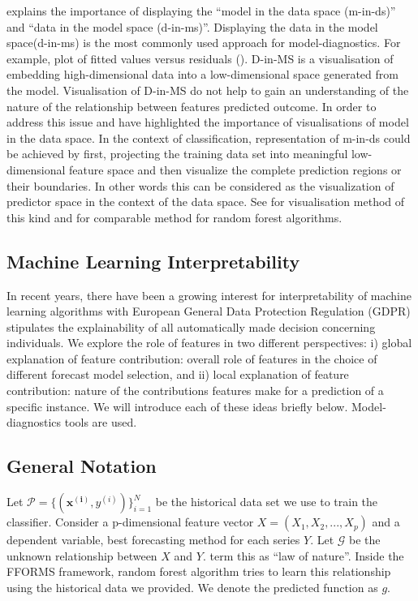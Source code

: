 \documentclass[11pt,a4paper,]{article}
\theoremstyle{definition}
\theoremstyle{definition}
\theoremstyle{definition}
\theoremstyle{remark}
\begin{document}
\textcite{wickham2015visualizing} explains the importance of displaying
the ``model in the data space (m-in-ds)'' and ``data in the model space
(d-in-ms)''. Displaying the data in the model space(d-in-ms) is the most
commonly used approach for model-diagnostics. For example, plot of
fitted values versus residuals (\textcite{wickham2015visualizing}).
D-in-MS is a visualisation of embedding high-dimensional data into a
low-dimensional space generated from the model. Visualisation of D-in-MS
do not help to gain an understanding of the nature of the relationship
between features predicted outcome. In order to address this issue
\textcite{wickham2015visualizing} and \textcite{da2017interactive} have
highlighted the importance of visualisations of model in the data space.
In the context of classification, representation of m-in-ds could be
achieved by first, projecting the training data set into meaningful
low-dimensional feature space and then visualize the complete prediction
regions or their boundaries. In other words this can be considered as
the visualization of predictor space in the context of the data space.
See \textcite{wickham2015visualizing} for visualisation method of this
kind and \textcite{da2017interactive} for comparable method for random
forest algorithms.

\subsection{Machine Learning
Interpretability}\label{machine-learning-interpretability}

In recent years, there have been a growing interest for interpretability
of machine learning algorithms with European General Data Protection
Regulation (GDPR) stipulates the explainability of all automatically
made decision concerning individuals. We explore the role of features in
two different perspectives: i) global explanation of feature
contribution: overall role of features in the choice of different
forecast model selection, and ii) local explanation of feature
contribution: nature of the contributions features make for a prediction
of a specific instance. We will introduce each of these ideas briefly
below. Model-diagnostics tools are used.

\subsection{General Notation}\label{general-notation}

Let \(\mathcal{P}=\{(\mathbf{x^{(i)}}, y^{(i)})\}_{i=1}^{N}\) be the
historical data set we use to train the classifier. Consider a
p-dimensional feature vector \(X=(X_1, X_2, ..., X_p)\) and a dependent
variable, best forecasting method for each series \(Y\). Let
\(\mathcal{G}\) be the unknown relationship between \(X\) and \(Y\).
\textcite{Zhao} term this as ``law of nature''. Inside the FFORMS
framework, random forest algorithm tries to learn this relationship
using the historical data we provided. We denote the predicted function
as \(g\).
\end{document}
